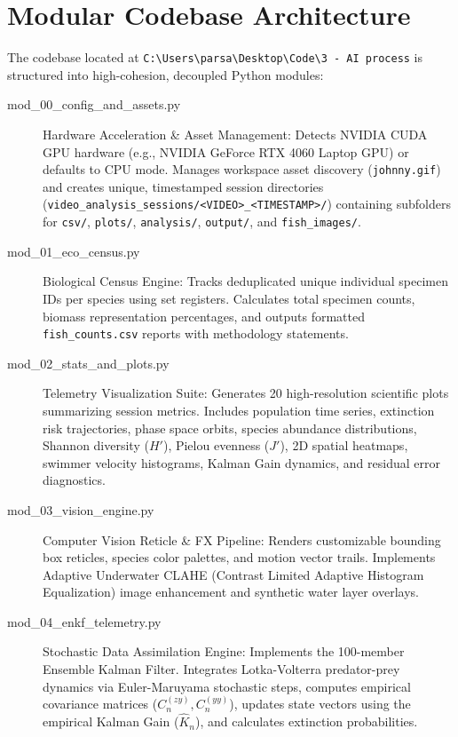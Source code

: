 \documentclass[11pt,a4paper]{article}
\begin{document}
\section{Modular Codebase Architecture}
The codebase located at \texttt{C:\textbackslash Users\textbackslash parsa\textbackslash Desktop\textbackslash Code\textbackslash 3 - AI process} is structured into high-cohesion, decoupled Python modules:

\begin{description}
    \item[mod\_00\_config\_and\_assets.py] Hardware Acceleration \& Asset Management:
    Detects NVIDIA CUDA GPU hardware (e.g., NVIDIA GeForce RTX 4060 Laptop GPU) or defaults to CPU mode. Manages workspace asset discovery (\texttt{johnny.gif}) and creates unique, timestamped session directories (\texttt{video\_analysis\_sessions/<VIDEO>\_<TIMESTAMP>/}) containing subfolders for \texttt{csv/}, \texttt{plots/}, \texttt{analysis/}, \texttt{output/}, and \texttt{fish\_images/}.
    
    \item[mod\_01\_eco\_census.py] Biological Census Engine:
    Tracks deduplicated unique individual specimen IDs per species using set registers. Calculates total specimen counts, biomass representation percentages, and outputs formatted \texttt{fish\_counts.csv} reports with methodology statements.
    
    \item[mod\_02\_stats\_and\_plots.py] Telemetry Visualization Suite:
    Generates 20 high-resolution scientific plots summarizing session metrics. Includes population time series, extinction risk trajectories, phase space orbits, species abundance distributions, Shannon diversity ($H'$), Pielou evenness ($J'$), 2D spatial heatmaps, swimmer velocity histograms, Kalman Gain dynamics, and residual error diagnostics.
    
    \item[mod\_03\_vision\_engine.py] Computer Vision Reticle \& FX Pipeline:
    Renders customizable bounding box reticles, species color palettes, and motion vector trails. Implements Adaptive Underwater CLAHE (Contrast Limited Adaptive Histogram Equalization) image enhancement and synthetic water layer overlays.
    
    \item[mod\_04\_enkf\_telemetry.py] Stochastic Data Assimilation Engine:
    Implements the 100-member Ensemble Kalman Filter. Integrates Lotka-Volterra predator-prey dynamics via Euler-Maruyama stochastic steps, computes empirical covariance matrices ($C_n^{(zy)}, C_n^{(yy)}$), updates state vectors using the empirical Kalman Gain ($\hat{K}_n$), and calculates extinction probabilities.
    

\end{description}
\end{document}
